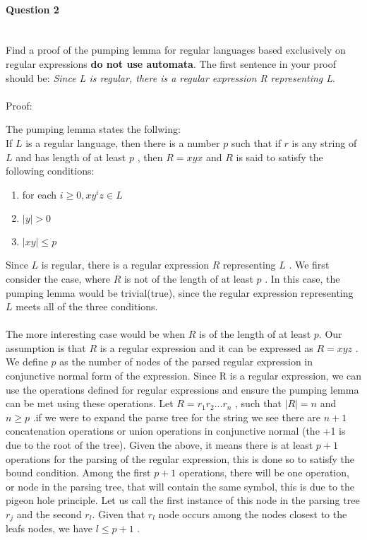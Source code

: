 \documentclass{report}
\newcommand{\me}[1]{
\begin{math}
#1
\end{math}
}
\begin{document}
 
 
 \newpage
\paragraph{\Large{Question 2\\ \\}}
Find a proof of the pumping lemma for regular languages based exclusively on regular expressions \textbf{do not use automata}. The first sentence in your proof should be: \textit{Since L is regular, there is a regular expression R representing L}. \\ \\
Proof:

The pumping lemma states the follwing: \\
If \me{L} is a regular language, then there is a number \me{p} such that if \me{r} is any string of \me{L} and has length of at least \me{p}, then  \me{R=xyx} and \me{R} is said to satisfy the following conditions:
\begin{enumerate}
  \item for each \me{i \geq 0, xy^i z \in L} 
  \item \me{|y| > 0}
  \item \me{|xy| \leq p}
\end{enumerate}


Since \me{L} is regular, there is a regular expression \me{R} representing \me{L}. We first consider the case, where \me{R} is not of the length of at least \me{p}. In this case, the pumping lemma would be trivial(true), since the regular expression representing \me{L} meets all of the three conditions. 
\\ \\
 The more interesting case would be when \me{R} is of the length of at least \me{p.} Our assumption is that \me{R} is a regular expression and it can be expressed as \me{R = xyz}. We define \me{p} as the number of nodes of the parsed regular expression in conjunctive normal form of the expression. Since R is a regular expression, we can use the operations defined for regular expressions and ensure the pumping lemma can be met using these operations. Let \me{R = r_1r_2...r_n}, such that \me{|R| = n} and \me{n \geq p}.if we were to expand the parse tree for the string we see there are\me{n+1} concatenation operations or union operations in conjunctive normal (the +1 is due to the root of the tree). Given the above, it means there is at least \me{p+1} operations for the parsing of the regular expression, this is done so to satisfy the bound condition. Among the first \me{p+1} operations, there will be one operation, or node in the parsing  tree, that will contain the same symbol, this is due to the pigeon hole principle. Let us call the first instance of this node in the parsing tree \me{r_j} and the  second \me{r_l.} Given that \me{r_l} node occurs among the nodes closest to the leafs nodes, we have \me{l \leq p+1}. \\
 
\end{document}
